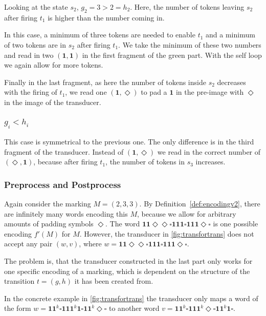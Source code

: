 Looking at the state $s_{2}$, $g_{2} = 3 > 2 = h_{2}$. Here, the number of tokens leaving $s_{2}$ after firing $t_{1}$ is higher than the number coming in. 

In this case, a minimum of three tokens are needed to enable $t_{1}$ and a minimum of two tokens are in $s_{2}$ after firing $t_{1}$. We take the minimum of these two numbers and read in two $(\bm{1},\bm{1})$ in the first fragment of the green part. With the self loop we again allow for more tokens. 

Finally in the last fragment, as here the number of tokens inside $s_{2}$ decreases with the firing of $t_{1}$, we read one $(\bm{1},\Diamond)$ to pad a $\bm{1}$ in the pre-image with $\Diamond$ in the image of the transducer.

\subsubsection{$g_{i} < h_{i}$}
This case is symmetrical to the previous one. The only difference is in the third fragment of the transducer. Instead of $(\bm{1},\Diamond)$ we read in the correct number of $(\Diamond,\bm{1})$, because after firing $t_{1}$, the number of tokens in $s_{3}$ increases.


\subsubsection{Preprocess and Postprocess}

Again consider the marking $M = (2,3,3)$. By Definition~\autoref{def:encodingv2}, there are infinitely many words encoding this $M$, because we allow for arbitrary amounts of padding symbols $\Diamond$. The word $\bm{11\Diamond\Diamond\square111\square111\Diamond\square}$ is one possible encoding $f'(M)$ for $M$. However, the transducer in \autoref{fig:transfortrans} does not accept any pair $(w,v)$, where $w=\bm{11\Diamond\Diamond\square111\square111\Diamond\square}$.

The problem is, that the transducer constructed in the last part only works for one specific encoding of a marking, which is dependent on the structure of the transition $t = (g,h)$ it has been created from. 


In the concrete example in \autoref{fig:transfortrans} the transducer only maps a word of the form $w = \bm{11}^{k}\square\bm{111}^{k}\bm{1}\square\bm{11}^{k}\Diamond\square$ to another word $v = \bm{11}^{k}\square\bm{111}^{k}\Diamond\square\bm{11}^{k}\bm{1}\square$.

